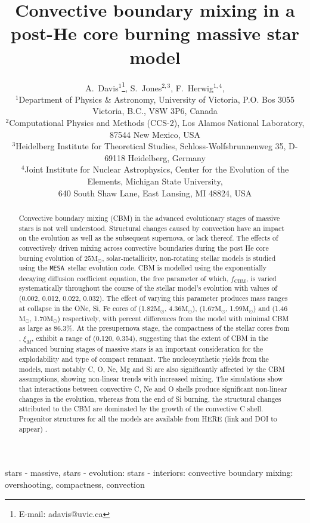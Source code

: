 \documentclass[useAMS,usenatbib]{mn2e}
\title{Convective boundary mixing in a post-He core burning massive star model}
\author[A.~Davis et.~al]{
A.~Davis$^1$\thanks{E-mail: adavis@uvic.ca},
S.~Jones$^{2,3}$,
F.~Herwig$^{1,4}$,
\\
$^{1}$Department of Physics \& Astronomy, University of Victoria, P.O. Bos 3055
Victoria, B.C., V8W 3P6, Canada\\
$^{2}$Computational Physics and Methods (CCS-2), Los Alamos National
Laboratory, 87544 New Mexico, USA\\
$^{3}$Heidelberg Institute for Theoretical Studies, Schloss-Wolfsbrunnenweg 35,
D-69118 Heidelberg, Germany\\
$^{4}$Joint Institute for Nuclear Astrophysics, Center for the Evolution of the
Elements, Michigan State University, \\ 640 South Shaw Lane, East Lansing, MI
48824, USA}
\newcommand{\Msun}{\ensuremath{\mathrm{M}_\odot}}
\newcommand{\red}[1]{{\color{red} #1} }
\newcommand{\fcbm}{\ensuremath{f_\mathrm{CBM}}}
\newcommand{\mesa}{\texttt{MESA}}
\begin{document}


\maketitle

\label{firstpage}

\begin{abstract} Convective boundary mixing (CBM) in the advanced
	evolutionary stages of massive stars is not well understood. Structural
	changes caused by convection have an impact on the evolution as well as
	the subsequent supernova, or lack thereof. The effects of convectively 
	driven mixing across convective boundaries during the post He core burning 
	evolution of $25\Msun$, solar-metallicity, non-rotating stellar models is 
	studied using the \mesa~stellar evolution code. CBM is modelled using 
	the exponentially decaying diffusion coefficient 
	equation, the free parameter of which, \fcbm, is varied systematically throughout 
	the course of the stellar model's evolution with values of (0.002, 0.012, 
	0.022, 0.032). The effect of varying this 
	parameter produces mass ranges at collapse in the ONe, Si, Fe cores 
	of (1.82\Msun, 4.36\Msun), (1.67\Msun, 1.99\Msun) and (1.46\Msun, 
	1.70\Msun) respectively, with percent differences from the model with 
	minimal CBM as large as 86.3\%. At the presupernova stage, the 
	compactness of the stellar cores from \citet{OConnor2011}, $\xi_M$, exhibit a range 
	of (0.120, 0.354), suggesting that the extent 
	of CBM in the advanced burning stages of massive 
	stars is an important consideration for the explodability and type of 
	compact remnant. The nucleosynthetic yields from the models, most 
	notably C, O, Ne, Mg and Si are also significantly affected by the 
	CBM assumptions, showing non-linear trends 
	with increased mixing. The simulations show that interactions 
	between convective C, Ne and O shells produce significant non-linear 
	changes in the evolution, whereas from the end of Si burning, the 
	structural changes attributed to the CBM 
	are dominated by the growth of the convective C shell.
	Progenitor structures for all the models are available from \red{HERE
	(link and DOI to appear)}.

\end{abstract}

\begin{keywords} 
stars - massive, stars - evolution: stars - interiors: convective boundary mixing: overshooting, compactness, convection
\end{keywords}
\end{document}
